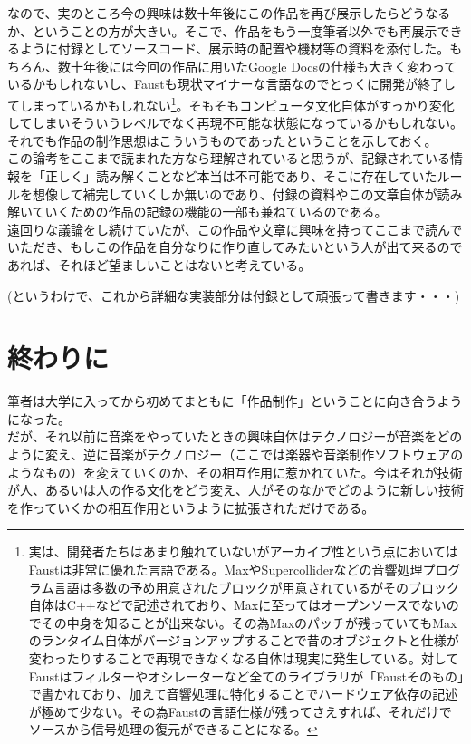 \documentclass[a4paper,report]{jsbook}
\begin{document}
なので、実のところ今の興味は数十年後にこの作品を再び展示したらどうなるか、ということの方が大きい。そこで、作品をもう一度筆者以外でも再展示できるように付録としてソースコード、展示時の配置や機材等の資料を添付した。もちろん、数十年後には今回の作品に用いたGoogle
Docsの仕様も大きく変わっているかもしれないし、Faustも現状マイナーな言語なのでとっくに開発が終了してしまっているかもしれない\footnote{実は、開発者たちはあまり触れていないがアーカイブ性という点においてはFaustは非常に優れた言語である。MaxやSupercolliderなどの音響処理プログラム言語は多数の予め用意されたブロックが用意されているがそのブロック自体はC++などで記述されており、Maxに至ってはオープンソースでないのでその中身を知ることが出来ない。その為Maxのパッチが残っていてもMaxのランタイム自体がバージョンアップすることで昔のオブジェクトと仕様が変わったりすることで再現できなくなる自体は現実に発生している。対してFaustはフィルターやオシレーターなど全てのライブラリが「Faustそのもの」で書かれており、加えて音響処理に特化することでハードウェア依存の記述が極めて少ない。その為Faustの言語仕様が残ってさえすれば、それだけでソースから信号処理の復元ができることになる。}。そもそもコンピュータ文化自体がすっかり変化してしまいそういうレベルでなく再現不可能な状態になっているかもしれない。それでも作品の制作思想はこういうものであったということを示しておく。\\
この論考をここまで読まれた方なら理解されていると思うが、記録されている情報を「正しく」読み解くことなど本当は不可能であり、そこに存在していたルールを想像して補完していくしか無いのであり、付録の資料やこの文章自体が読み解いていくための作品の記録の機能の一部も兼ねているのである。\\
遠回りな議論をし続けていたが、この作品や文章に興味を持ってここまで読んでいただき、もしこの作品を自分なりに作り直してみたいという人が出て来るのであれば、それほど望ましいことはないと考えている。

(というわけで、これから詳細な実装部分は付録として頑張って書きます・・・)

\section{終わりに}\label{ux7d42ux308fux308aux306b}

筆者は大学に入ってから初めてまともに「作品制作」ということに向き合うようになった。\\
だが、それ以前に音楽をやっていたときの興味自体はテクノロジーが音楽をどのように変え、逆に音楽がテクノロジー（ここでは楽器や音楽制作ソフトウェアのようなもの）を変えていくのか、その相互作用に惹かれていた。今はそれが技術が人、あるいは人の作る文化をどう変え、人がそのなかでどのように新しい技術を作っていくかの相互作用というように拡張されただけである。
\end{document}
